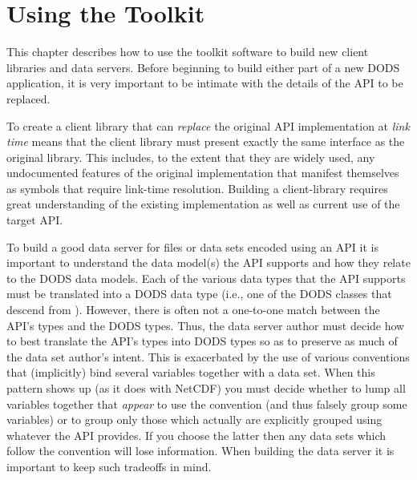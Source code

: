 %
%
%
%
%
%
%
%
%

\chapter{Using the Toolkit}
\label{pguide,using}
\label{tk,using}

This chapter describes how to use the toolkit software to build new
client libraries and data servers. Before beginning to build either
part of a new DODS application, it is very important to be intimate
with the details of the API to be replaced.  

To create a client library that can \emph{replace} the original API
implementation at \emph{link time} means that the client library must
present exactly the same interface as the original library. This
includes, to the extent that they are widely used, any undocumented
features of the original implementation that manifest themselves as
symbols that require link-time resolution. Building a client-library
requires great understanding of the existing implementation as well as
current use of the target API.

To build a good data server for files or data sets encoded using an
API it is important to understand the data model(s) the API supports
and how they relate to the DODS data models. Each of the various data
types that the API supports must be translated into a DODS data type
(i.e., one of the DODS classes that descend from ).
However, there is often not a one-to-one match between the API's types
and the DODS types. Thus, the data server author must decide how to
best translate the API's types into DODS types so as to preserve as
much of the data set author's intent. This is exacerbated by the use
of various conventions that (implicitly) bind several variables
together with a data set. When this pattern shows up (as it does with
NetCDF) you must decide whether to lump all variables together that
\emph{appear} to use the convention (and thus falsely group some
variables) or to group only those which actually are explicitly
grouped using whatever the API provides. If you choose the latter then
any data sets which follow the convention will lose information. When
building the data server it is important to keep such tradeoffs in
mind.

